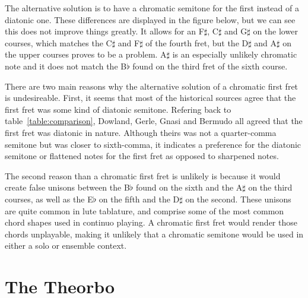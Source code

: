 %



The alternative solution is to have a chromatic semitone for the first instead of a diatonic
one.  These differences are displayed in the figure below, but we can see this does not
improve things greatly.  It allows for an F$\sharp$, C$\sharp$ and G$\sharp$ on the lower courses,
which matches the C$\sharp$ and F$\sharp$
of the fourth fret, but the D$\sharp$ and A$\sharp$ on the upper courses proves to be a problem.
A$\sharp$ is an especially unlikely chromatic note and it does not match the
B$\flat$ found on the third fret of the sixth course.

%



There are two main reasons why the alternative solution of a chromatic first fret is undesireable.
First, it seems that most of the historical sources agree that the first fret was some kind of
diatonic semitone.  Refering back to table~\ref{table:comparison}, Dowland, Gerle, Gnasi and Bermudo all
agreed that the first fret was diatonic in nature.  Although theirs was not a quarter-comma semitone
but was closer to sixth-comma, it indicates a preference for the diatonic semitone
or flattened notes for the first fret as opposed to sharpened notes.

The second reason than a chromatic first fret is unlikely is because it would create false unisons
between the B$\flat$ found on the sixth and the A$\sharp$ on the third courses, as well as
the E$\flat$ on the fifth and the D$\sharp$ on the second.
These unisons are quite common in lute tablature, and comprise some of the most common chord shapes
used in continuo playing.  A chromatic first fret would render those chords unplayable, making it
unlikely that a chromatic semitone would be used in either a solo or ensemble context.


\section{The Theorbo}

